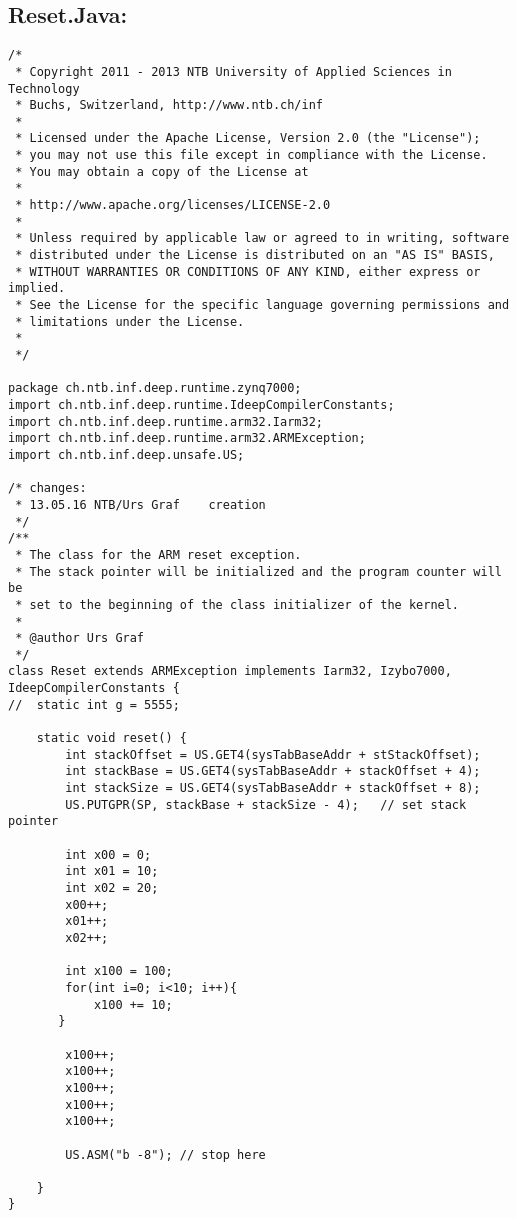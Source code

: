 \subsection{Reset.Java:}
\label{anhang:reset.java}
\lstset{language=java}
\begin{lstlisting}
/*
 * Copyright 2011 - 2013 NTB University of Applied Sciences in Technology
 * Buchs, Switzerland, http://www.ntb.ch/inf
 * 
 * Licensed under the Apache License, Version 2.0 (the "License");
 * you may not use this file except in compliance with the License.
 * You may obtain a copy of the License at
 * 
 * http://www.apache.org/licenses/LICENSE-2.0
 *   
 * Unless required by applicable law or agreed to in writing, software
 * distributed under the License is distributed on an "AS IS" BASIS,
 * WITHOUT WARRANTIES OR CONDITIONS OF ANY KIND, either express or implied.
 * See the License for the specific language governing permissions and
 * limitations under the License.
 * 
 */

package ch.ntb.inf.deep.runtime.zynq7000;
import ch.ntb.inf.deep.runtime.IdeepCompilerConstants;
import ch.ntb.inf.deep.runtime.arm32.Iarm32;
import ch.ntb.inf.deep.runtime.arm32.ARMException;
import ch.ntb.inf.deep.unsafe.US;

/* changes:
 * 13.05.16	NTB/Urs Graf	creation
 */
/**
 * The class for the ARM reset exception.
 * The stack pointer will be initialized and the program counter will be
 * set to the beginning of the class initializer of the kernel.
 * 
 * @author Urs Graf
 */
class Reset extends ARMException implements Iarm32, Izybo7000, IdeepCompilerConstants {
//	static int g = 5555;
	
	static void reset() {
		int stackOffset = US.GET4(sysTabBaseAddr + stStackOffset);
		int stackBase = US.GET4(sysTabBaseAddr + stackOffset + 4);
		int stackSize = US.GET4(sysTabBaseAddr + stackOffset + 8);
		US.PUTGPR(SP, stackBase + stackSize - 4);	// set stack pointer
		
		int x00 = 0;
		int x01 = 10;
		int x02 = 20;
		x00++;
		x01++;
		x02++;
		
		int x100 = 100;
		for(int i=0; i<10; i++){
            x100 += 10;
       }
		
		x100++;
		x100++;
		x100++;
		x100++;
		x100++;

		US.ASM("b -8"); // stop here

	}	
}
\end{lstlisting}




